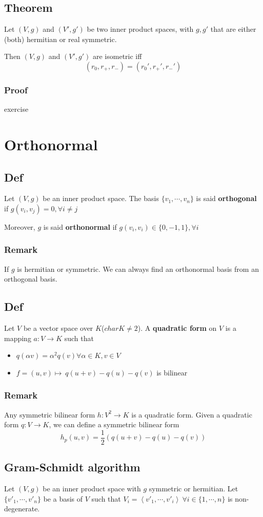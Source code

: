 \documentclass{book}
\begin{document}
\section{Theorem}
Let $(V,g)$ and $(V',g')$ be two inner product spaces, with $g,g'$ that are either (both) hermitian or real symmetric.

Then $(V,g)$ and $(V',g')$ are isometric iff$$(r_0,r_+,r_-)=(r_0',r_+',r_-')$$
\subsection*{Proof}
exercise
\chapter{Orthonormal}
\section{Def}
Let $(V,g)$ be an inner product space. The basis $\{v_1,\cdots, v_n\}$ is said \textbf{orthogonal} if $g(v_i,v_j)=0,\forall i\neq j$

Moreover, $g$ is said \textbf{orthonormal} if $g(v_i,v_i)\in \{0,-1,1\},\forall i$
\subsection*{Remark}
If $g$ is hermitian or symmetric. We can always find an orthonormal basis from an orthogonal basis.
\section{Def}
Let $V$ be a vector space over $K$($char K\neq 2$). A \textbf{quadratic form} on $V$ is a mapping $a:V\rightarrow K$ such that
\begin{itemize}
    \item $q(\alpha v)=\alpha^2q(v)\forall \alpha\in K,v\in V$
    \item $f=(u,v)\mapsto\ q(u+v)-q(u)-q(v)$ is bilinear
\end{itemize}
\subsection*{Remark}
Any symmetric bilinear form $h:V^2\rightarrow K$ is a quadratic form. Given a quadratic form $q:V\rightarrow K$, we can define a symmetric bilinear form$$h_p(u,v)=\frac{1}{2}\left(q(u+v)-q(u)-q(v)\right)$$
\section{Gram-Schmidt algorithm}
Let $(V,g)$ be an inner product space with $g$ symmetric or hermitian. Let $\{v'_1,\cdots,v'_n\}$ be a basis of $V$ such that $V_i=\left<v'_1,\cdots,v'_i\right>\ \forall i\in \{1,\cdots,n\}$ is non-degenerate.
\end{document}
